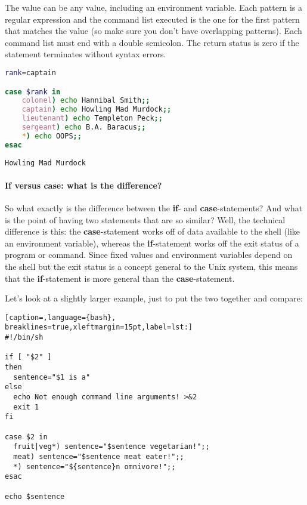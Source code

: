 The value can be any value, including an environment variable. Each pattern is
a regular expression and the command list executed is the one for the first
pattern that matches the value (so make sure you don't have overlapping
patterns). Each command list must end with a double semicolon. The return
status is zero if the statement terminates without syntax errors.
\lstset{basicstyle=\scriptsize, numbers=left, captionpos=b, tabsize=4}
\begin{lstlisting}[caption=The last 'if'-example revisited,language={bash},
breaklines=true,xleftmargin=15pt,label=lst:The last 'if'-example revisited]
rank=captain

case $rank in
    colonel) echo Hannibal Smith;;
    captain) echo Howling Mad Murdock;;
    lieutenant) echo Templeton Peck;;
    sergeant) echo B.A. Baracus;;
    *) echo OOPS;;
esac
\end{lstlisting}

\scriptsize
\begin{verbatim}
Howling Mad Murdock
\end{verbatim}
\normalsize

\paragraph{If versus case: what is the difference?}
So what exactly is the difference between the \textbf{if}- and
\textbf{case}-statements? And what is the point of having two statements that
are so similar? Well, the technical difference is this: the
\textbf{case}-statement works off of data available to the shell (like an
environment variable), whereas the \textbf{if}-statement works off the exit
status of a program or command. Since fixed values and environment variables
depend on the shell but the exit status is a concept general to the Unix
system, this means that the \textbf{if}-statement is more general than the
\textbf{case}-statement.

Let's look at a slightly larger example, just to put the two together and compare:
\lstset{basicstyle=\scriptsize, numbers=left, captionpos=b, tabsize=4}
\begin{lstlisting}[caption=,language={bash},
breaklines=true,xleftmargin=15pt,label=lst:]
#!/bin/sh

if [ "$2" ]
then
  sentence="$1 is a"
else
  echo Not enough command line arguments! >&2
  exit 1
fi

case $2 in
  fruit|veg*) sentence="$sentence vegetarian!";;
  meat) sentence="$sentence meat eater!";;
  *) sentence="${sentence}n omnivore!";;
esac

echo $sentence
\end{lstlisting}

